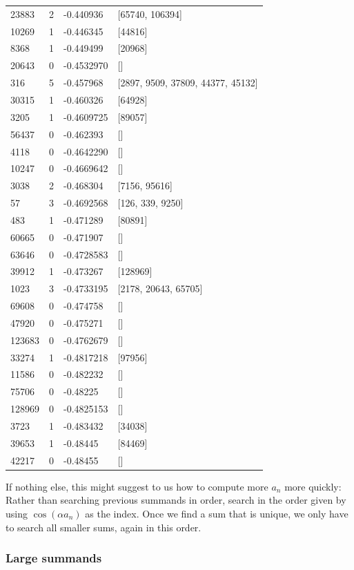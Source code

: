 \documentclass{article}
\theoremstyle{definition}
\theoremstyle{remark}
\numberwithin{equation}{section}
\begin{document}
{\begin{tabular}{llll}
23883 & 2 & -0.440936 & [65740, 106394]\\
10269 & 1 & -0.446345 & [44816]\\
8368 & 1 & -0.449499 & [20968]\\
20643 & 0 & -0.4532970 & []\\
316 & 5 & -0.457968 & [2897, 9509, 37809, 44377, 45132]\\
30315 & 1 & -0.460326 & [64928]\\
3205 & 1 & -0.4609725 & [89057]\\
56437 & 0 & -0.462393 & []\\
4118 & 0 & -0.4642290 & []\\
10247 & 0 & -0.4669642 & []\\
3038 & 2 & -0.468304 & [7156, 95616]\\
57 & 3 & -0.4692568 & [126, 339, 9250]\\
483 & 1 & -0.471289 & [80891]\\
60665 & 0 & -0.471907 & []\\
63646 & 0 & -0.4728583 & []\\
39912 & 1 & -0.473267 & [128969]\\
1023 & 3 & -0.4733195 & [2178, 20643, 65705]\\
69608 & 0 & -0.474758 & []\\
47920 & 0 & -0.475271 & []\\
123683 & 0 & -0.4762679 & []\\
33274 & 1 & -0.4817218 & [97956]\\
11586 & 0 & -0.482232 & []\\
75706 & 0 & -0.48225 & []\\
128969 & 0 & -0.4825153 & []\\
3723 & 1 & -0.483432 & [34038]\\
39653 & 1 & -0.48445 & [84469]\\
42217 & 0 & -0.48455 & []
\end{tabular}

If nothing else, this might suggest to us how to compute more $a_n$ more
quickly: Rather than searching previous summands in order, search in
the order given by using $\cos(\alpha a_n)$ as the index.  Once we find a
sum that is unique, we only have to search all smaller sums, again in
this order.  

\subsubsection{Large summands}

}
\end{document}
